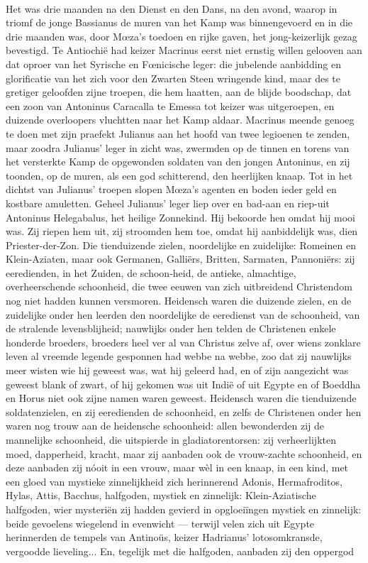 \documentclass[a4paper, 12pt, oneside, dutch]{article}
\begin{document}
\paragraph{}
Het was drie maanden na den Dienst en den Dans, na den avond, waarop in triomf de jonge Bassianus de muren van het Kamp was binnengevoerd en in die drie maanden was, door Mœza's toedoen en rijke gaven, het jong-keizerlijk gezag bevestigd. Te Antiochië had keizer Macrinus eerst niet ernstig willen gelooven aan dat oproer van het Syrische en Fœnicische leger: die jubelende aanbidding en glorificatie van het zich voor den Zwarten Steen wringende kind, maar des te gretiger geloofden zijne troepen, die hem haatten, aan de blijde boodschap, dat een zoon van Antoninus Caracalla te Emessa tot keizer was uitgeroepen, en duizende overloopers vluchtten naar het Kamp aldaar. Macrinus meende genoeg te doen met zijn praefekt Julianus aan het hoofd van twee legioenen te zenden, maar zoodra Julianus' leger in zicht was, zwermden op de tinnen en torens van het versterkte Kamp de opgewonden soldaten van den jongen Antoninus, en zij toonden, op de muren, als een god schitterend, den heerlijken knaap. Tot in het dichtst van Julianus' troepen slopen Mœza's agenten en boden ieder geld en kostbare amuletten. Geheel Julianus' leger liep over en bad-aan en riep-uit Antoninus Helegabalus, het heilige Zonnekind. Hij bekoorde hen omdat hij mooi was. Zij riepen hem uit, zij stroomden hem toe, omdat hij aanbiddelijk was, dien Priester-der-Zon. Die tienduizende zielen, noordelijke en zuidelijke: Romeinen en Klein-Aziaten, maar ook Germanen, Galliërs, Britten, Sarmaten, Pannoniërs: zij eeredienden, in het Zuiden, de schoon-heid, de antieke, almachtige, overheerschende schoonheid, die twee eeuwen van zich uitbreidend Christendom nog niet hadden kunnen versmoren. Heidensch waren die duizende zielen, en de zuidelijke onder hen leerden den noordelijke de eeredienst van de schoonheid, van de stralende levensblijheid; nauwlijks onder hen telden de Christenen enkele honderde broeders, broeders heel ver al van Christus zelve af, over wiens zonklare leven al vreemde legende gesponnen had webbe na webbe, zoo dat zij nauwlijks meer wisten wie hij geweest was, wat hij geleerd had, en of zijn aangezicht was geweest blank of zwart, of hij gekomen was uit Indië of uit Egypte en of Boeddha en Horus niet ook zijne namen waren geweest. Heidensch waren die tienduizende soldatenzielen, en zij eeredienden de schoonheid, en zelfs de Christenen onder hen waren nog trouw aan de heidensche schoonheid: allen bewonderden zij de mannelijke schoonheid, die uitspierde in gladiatorentorsen: zij verheerlijkten moed, dapperheid, kracht, maar zij aanbaden ook de vrouw-zachte schoonheid, en deze aanbaden zij nóoit in een vrouw, maar wèl in een knaap, in een kind, met een gloed van mystieke zinnelijkheid zich herinnerend Adonis, Hermafroditos, Hylas, Attis, Bacchus, halfgoden, mystiek en zinnelijk: Klein-Aziatische halfgoden, wier mysteriën zij hadden gevierd in opgloeiïngen mystiek en zinnelijk: beide gevoelens wiegelend in evenwicht --- terwijl velen zich uit Egypte herinnerden de tempels van Antinoüs, keizer Hadrianus' lotosomkransde, vergoodde lieveling... En, tegelijk met die halfgoden, aanbaden zij den oppergod 
\end{document}
